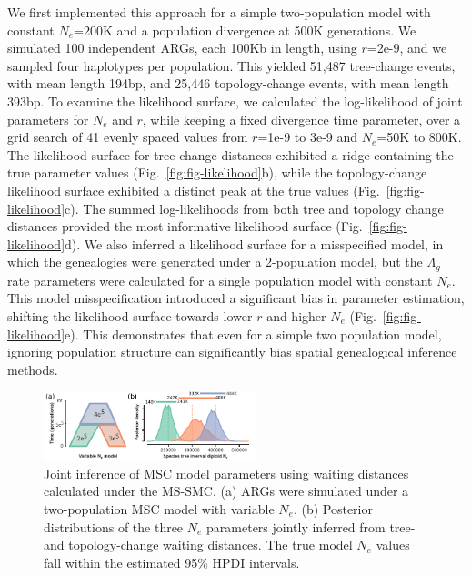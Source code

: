 \documentclass[11pt]{article}
\begin{document}
We first implemented this approach for a simple two-population model with 
constant $N_e$=200K and a population divergence at 500K generations. 
We simulated 100 independent ARGs, each 100Kb in length, using $r$=2e-9, 
and we sampled four haplotypes per population. This 
yielded 51,487 tree-change events, with mean length 194bp, and 25,446 
topology-change events, with mean length 393bp. To examine the likelihood
surface, we calculated the log-likelihood of joint parameters for $N_e$ and $r$, 
while keeping a fixed divergence time parameter, over a grid search of 41
evenly spaced values from $r$=1e-9 to 3e-9 and 
$N_e$=50K to 800K. The likelihood
surface for tree-change distances exhibited a ridge containing the true 
parameter values (Fig.~\ref{fig:fig-likelihood}b), while the topology-change 
likelihood surface exhibited a distinct peak at the true values
(Fig.~\ref{fig:fig-likelihood}c). The summed log-likelihoods from both tree 
and topology change distances provided the most informative likelihood surface
(Fig.~\ref{fig:fig-likelihood}d).
We also inferred a likelihood surface for a misspecified model, in which 
the genealogies were generated under a 2-population model, but 
the $\Lambda_g$ rate parameters were calculated for a single population 
model with constant $N_e$. This model misspecification introduced a significant 
bias in parameter estimation, shifting the likelihood surface towards lower $r$ 
and higher $N_e$ (Fig.~\ref{fig:fig-likelihood}e). This demonstrates that even 
for a simple two population model, ignoring population structure can significantly
bias spatial genealogical inference methods.

\begin{figure}[t]
	\centering
	\includegraphics[width=0.55\textwidth]{figures/likelihood-posteriors.pdf}
	\caption{
		Joint inference of MSC model parameters using waiting distances 
		calculated under the MS-SMC. (a) ARGs were simulated under a two-population 
		MSC model with variable $N_e$. (b) Posterior distributions of the three 
		$N_e$ parameters jointly inferred from tree- and topology-change waiting 
		distances. The true model $N_e$ values fall within the estimated 
		95\% HPDI intervals. 
	}
	\label{fig:fig-likelihood-posterior}
\end{figure}
\end{document}
